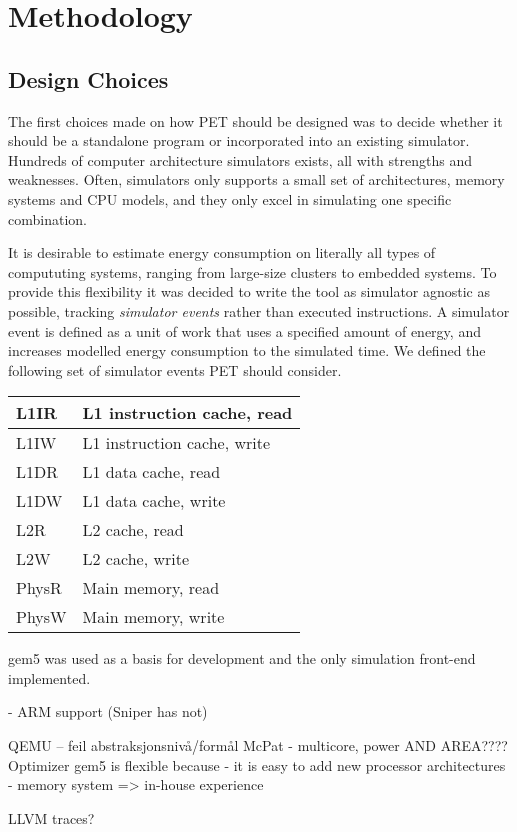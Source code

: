 \section{Methodology}

\subsection{Design Choices}
\label{subsec:design_choices}
The first choices made on how PET should be designed was to decide whether it
should be a standalone program or incorporated into an existing simulator.
Hundreds of computer architecture simulators exists, all with strengths and
weaknesses. Often, simulators only supports a small set of architectures, memory
systems and CPU models, and they only excel in simulating one specific
combination.

It is desirable to estimate energy consumption on literally all types of
compututing systems, ranging from large-size clusters to embedded systems. To
provide this flexibility it was decided to write the tool as simulator agnostic
as possible, tracking \emph{simulator events} rather than executed instructions.
A simulator event is defined as a unit of work that uses a specified amount of
energy, and increases modelled energy consumption to the simulated time. We
defined the following set of simulator events PET should consider.

\begin{center}
    \begin{tabular}{|l|l|}
        \hline
        L1IR    & L1 instruction cache, read \\
        \hline
        L1IW    & L1 instruction cache, write \\
        \hline
        L1DR    & L1 data cache, read \\
        \hline
        L1DW    & L1 data cache, write \\
        \hline
        L2R     & L2 cache, read \\
        \hline
        L2W     & L2 cache, write \\
        \hline
        PhysR   & Main memory, read \\
        \hline
        PhysW   & Main memory, write \\
        \hline
    \end{tabular}
\end{center}

gem5 was used as a basis for development and the only simulation front-end
implemented.




- ARM support (Sniper has not)

QEMU -- feil abstraksjonsnivå/formål
McPat - multicore, power AND AREA???? Optimizer
gem5 is flexible because
    - it is easy to add new processor architectures
    - memory system
=> in-house experience

LLVM traces?

